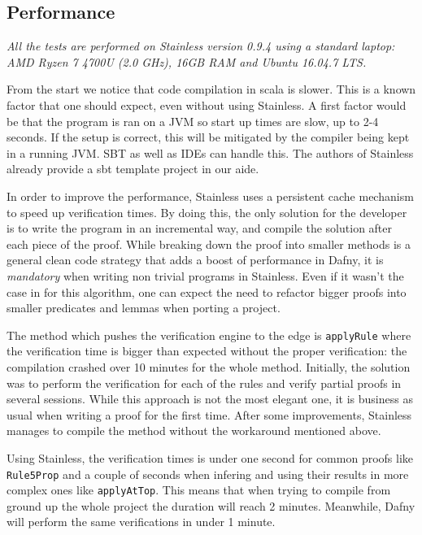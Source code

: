 \subsection{Performance}

\emph{All the tests are performed on Stainless version 0.9.4 using a standard laptop: AMD Ryzen 7 4700U (2.0 GHz), 16GB RAM and Ubuntu 16.04.7 LTS.}

From the start we notice that code compilation in scala is slower. This is a known factor that one 
should expect, even without using Stainless. A first factor would be that the program 
is ran on a JVM so start up times are slow, up to 2-4 seconds. If the setup is correct, this will
be mitigated by the compiler being kept in a running JVM. SBT as well as IDEs can handle this.
The authors of Stainless already provide a sbt template project in our aide. \cite{sbt}

In order to improve the performance, Stainless uses a persistent cache mechanism to speed up
verification times. By doing this, the only solution for the developer is to write the program
in an incremental way, and compile the solution after each piece of the proof. While
breaking down the proof into smaller methods is a general clean code strategy that adds a boost 
of performance in Dafny, it is \emph{mandatory}
when writing non trivial programs in Stainless. Even if it wasn't the case in for this algorithm, one
can expect the need to refactor bigger proofs into smaller predicates and lemmas when porting a project.

The method which pushes the verification engine to the edge is \texttt{applyRule} where the verification time
is bigger than expected without the proper verification: the compilation crashed over 10 minutes for the whole method. 
Initially, the solution was to perform the verification for each of the rules and verify partial proofs in
several sessions. While this approach is not the most elegant one, it is business as usual when 
writing a proof for the first time. After some improvements, Stainless manages to compile the method without the
workaround mentioned above.

Using Stainless, the verification times is under one second for common proofs like \texttt{Rule5Prop} 
and a couple of seconds when infering and using their results in more complex ones like \texttt{applyAtTop}.
This means that when trying to compile from ground up the whole project the duration will reach 2 minutes.
Meanwhile, Dafny will perform the same verifications in under 1 minute\cite{wollic}.

